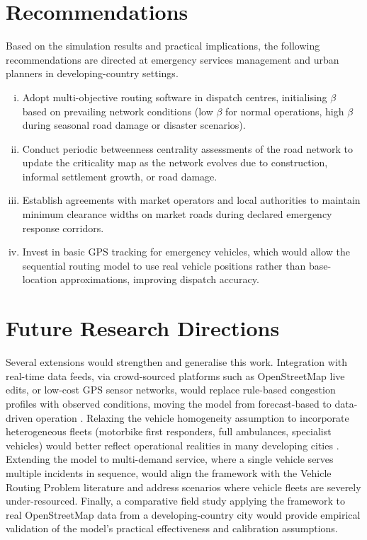 \documentclass[paper=A4, 12pt, mathscr]{report}
\begin{document}
	\section{Recommendations}
	
	Based on the simulation results and practical implications, the following recommendations are directed at emergency services management and urban planners in developing-country settings.
	
	\begin{enumerate}[(i)]
		\item Adopt multi-objective routing software in dispatch centres, initialising $\beta$ based on prevailing network conditions (low $\beta$ for normal operations, high $\beta$ during seasonal road damage or disaster scenarios).
		\item Conduct periodic betweenness centrality assessments of the road network to update the criticality map as the network evolves due to construction, informal settlement growth, or road damage.
		\item Establish agreements with market operators and local authorities to maintain minimum clearance widths on market roads during declared emergency response corridors.
		\item Invest in basic GPS tracking for emergency vehicles, which would allow the sequential routing model to use real vehicle positions rather than base-location approximations, improving dispatch accuracy.
	\end{enumerate}
	
	\section{Future Research Directions}
	
	Several extensions would strengthen and generalise this work. Integration with real-time data feeds,  via crowd-sourced platforms such as OpenStreetMap live edits, or low-cost GPS sensor networks,  would replace rule-based congestion profiles with observed conditions, moving the model from forecast-based to data-driven operation \cite{humagain,chowdhury2023}. Relaxing the vehicle homogeneity assumption to incorporate heterogeneous fleets (motorbike first responders, full ambulances, specialist vehicles) would better reflect operational realities in many developing cities \cite{du}. Extending the model to multi-demand service,  where a single vehicle serves multiple incidents in sequence,  would align the framework with the Vehicle Routing Problem literature \cite{tirkolaee2020} and address scenarios where vehicle fleets are severely under-resourced. Finally, a comparative field study applying the framework to real OpenStreetMap data from a developing-country city would provide empirical validation of the model's practical effectiveness and calibration assumptions.
	
\end{document}
